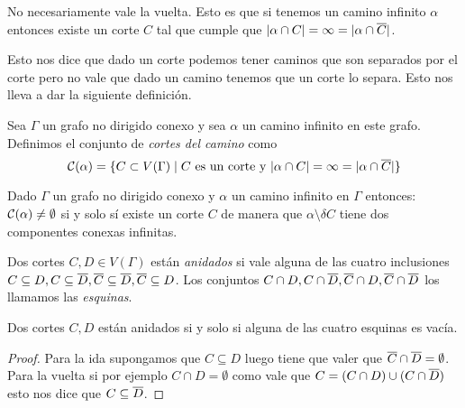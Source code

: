 \documentclass[tesis.tex]{subfiles}
\begin{document}
No necesariamente vale la vuelta.
Esto es que si tenemos un camino infinito $\alpha$ entonces existe un corte $C$ tal que cumple que $|\alpha \cap C| = \infty = |\alpha \cap \overline C|$.

Esto nos dice que dado un corte podemos tener caminos que son separados por el corte pero no vale que dado un camino tenemos que un corte lo separa.
Esto nos lleva a dar la siguiente definición.

\begin{deff}
	Sea $\Gamma$ un grafo no dirigido conexo y sea $\alpha$ un camino infinito en este grafo.
	Definimos el conjunto de \emph{cortes del camino} como 
	\[
		{\cal C}(\alpha) = \{ C \subset V(\Gamma) \mid  C \ \text{es un corte y} \ |\alpha \cap C| = \infty = |\alpha \cap \overline C| \}
	\] 
\end{deff}

\begin{obs}
	Dado $\Gamma$ un grafo no dirigido conexo y $\alpha$ un camino infinito en $\Gamma$ entonces: ${\cal C}(\alpha) \neq \emptyset$ si y solo sí existe un corte $C$ de manera que $\alpha \setminus \delta C$ tiene dos componentes conexas infinitas.
\end{obs}



\begin{deff}
	Dos cortes $C,D \in V(\Gamma)$ están \emph{anidados} si vale alguna de las cuatro inclusiones $C \subseteq D, C \subseteq \overline D, \overline C \subseteq \overline D, \overline C \subseteq D$.
	Los conjuntos $C \cap D, C \cap \overline D, \overline C \cap D, \overline C \cap \overline D$ los llamamos las \emph{esquinas}.
\end{deff}

\begin{lema}
	Dos cortes $C,D$ están anidados si y solo si alguna de las cuatro esquinas es vacía.
\end{lema}
\begin{proof}
	Para la ida supongamos que $C \subseteq D$ luego tiene que valer que $\overline C \cap \overline D = \emptyset$.
	Para la vuelta si por ejemplo $C \cap D = \emptyset$ como vale que $C = (C \cap D) \cup (C \cap \overline D)$ esto nos dice que $C \subseteq \overline D$.
	
\end{proof}
\end{document}
